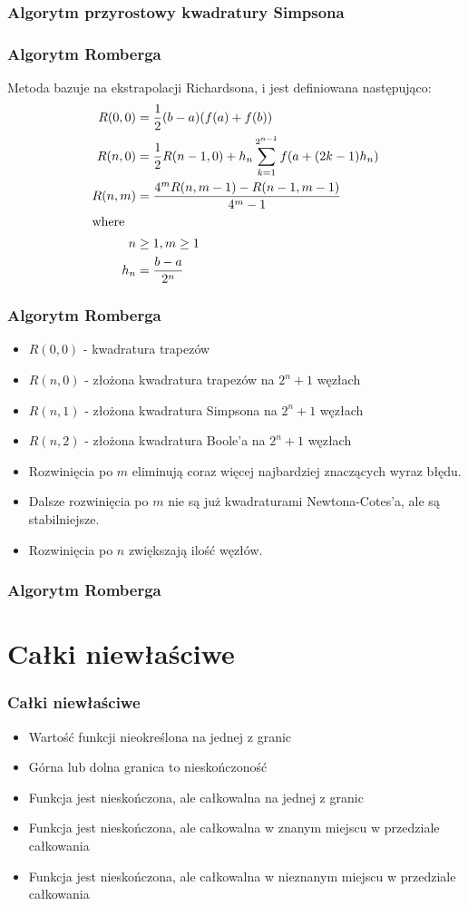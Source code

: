 \documentclass[compress,red]{beamer}
\begin{document}
\begin{frame}
  \frametitle{Algorytm przyrostowy kwadratury Simpsona}
  
\end{frame}
\begin{frame}
  \frametitle{Algorytm Romberga}
Metoda bazuje na ekstrapolacji Richardsona, i jest definiowana
następująco:
\begin{align*}
  R(0,0) &= \frac{1}{2} (b-a) (f(a) + f(b))\\
  R(n,0) &= \frac{1}{2} R(n-1,0) + h_n \sum_{k=1}^{2^{n-1}} f(a + (2k-1)h_n)\\
  R(n,m) &= \frac{4^mR(n,m-1) - R(n-1,m-1)}{4^m-1}\\
  \intertext{where}
  n &\ge 1,  m \ge 1\\
  h_n &= \frac{b-a}{2^n}
\end{align*}
\end{frame}
\begin{frame}
  \frametitle{Algorytm Romberga}
  \begin{itemize}
  \item
    $R(0,0)$ - kwadratura trapezów
  \item
    $R(n,0)$ - złożona kwadratura trapezów na $2^n+1$ węzłach
  \item
    $R(n,1)$ - złożona kwadratura Simpsona na $2^n+1$ węzłach
  \item
    $R(n,2)$ - złożona kwadratura Boole'a na $2^n+1$ węzłach
  \item
    Rozwinięcia po $m$ eliminują coraz więcej najbardziej znaczących
    wyraz błędu.
  \item
    Dalsze rozwinięcia po $m$ nie są już kwadraturami Newtona-Cotes'a,
    ale są stabilniejsze.
  \item
    Rozwinięcia po $n$ zwiększają ilość węzłów.
  \end{itemize}
\end{frame}
\begin{frame}
  \frametitle{Algorytm Romberga}
  
\end{frame}
	
\section{Całki niewłaściwe}
\begin{frame}
  \frametitle{Całki niewłaściwe}
  \begin{itemize}
    \item Wartość funkcji nieokreślona na jednej z granic
    \item Górna lub dolna granica to nieskończoność
    \item Funkcja jest nieskończona, ale całkowalna na jednej z granic
    \item Funkcja jest nieskończona, ale całkowalna w znanym miejscu w
      przedziale całkowania
    \item Funkcja jest nieskończona, ale całkowalna w nieznanym
      miejscu w przedziale całkowania
  \end{itemize}
\end{frame}
\end{document}
